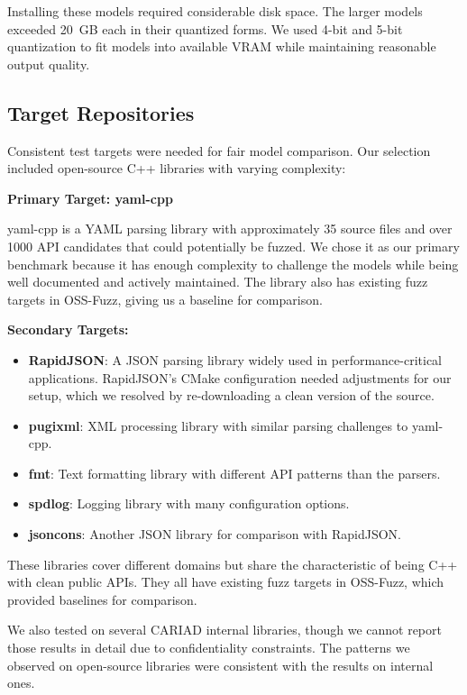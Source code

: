 Installing these models required considerable disk space. The larger models exceeded 20~GB each in their quantized forms. We used 4-bit and 5-bit quantization to fit models into available VRAM while maintaining reasonable output quality.

\subsection{Target Repositories}

Consistent test targets were needed for fair model comparison. Our selection included open-source C++ libraries with varying complexity:

\textbf{Primary Target: yaml-cpp}

yaml-cpp is a YAML parsing library with approximately 35 source files and over 1000 API candidates that could potentially be fuzzed. We chose it as our primary benchmark because it has enough complexity to challenge the models while being well documented and actively maintained. The library also has existing fuzz targets in OSS-Fuzz, giving us a baseline for comparison.

\textbf{Secondary Targets:}
\begin{itemize}
    \item \textbf{RapidJSON}: A JSON parsing library widely used in performance-critical applications. RapidJSON's CMake configuration needed adjustments for our setup, which we resolved by re-downloading a clean version of the source.
    \item \textbf{pugixml}: XML processing library with similar parsing challenges to yaml-cpp.
    \item \textbf{fmt}: Text formatting library with different API patterns than the parsers.
    \item \textbf{spdlog}: Logging library with many configuration options.
    \item \textbf{jsoncons}: Another JSON library for comparison with RapidJSON.
\end{itemize}

These libraries cover different domains but share the characteristic of being C++ with clean public APIs. They all have existing fuzz targets in OSS-Fuzz, which provided baselines for comparison.

We also tested on several CARIAD internal libraries, though we cannot report those results in detail due to confidentiality constraints. The patterns we observed on open-source libraries were consistent with the results on internal ones.

